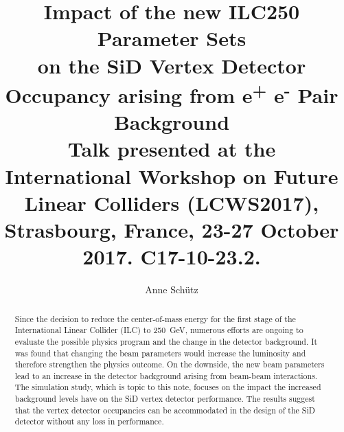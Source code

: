\documentclass[12pt]{article}
\newcommand{\sid}{SiD\xspace}
\newcommand{\electron}{e\textsuperscript{-}\xspace}
\newcommand{\positron}{e\textsuperscript{+}\xspace}
\begin{document}

\title{Impact of the new ILC250 Parameter Sets\\on the \sid Vertex Detector Occupancy arising from \positron\electron Pair Background\vspace*{0.3cm}\\{\normalsize Talk presented at the\\\large International Workshop on Future Linear Colliders (LCWS2017), Strasbourg, France, 23-27 October 2017. C17-10-23.2.}}

\author[1,2]{Anne Sch\"utz}


\maketitle


\begin{abstract}
Since the decision to reduce the center-of-mass energy for the first stage of the International Linear Collider (ILC) to \SI{250}{\GeV}, numerous efforts are ongoing to evaluate the possible physics program and the change in the detector background.
It was found that changing the beam parameters would increase the luminosity and therefore strengthen the physics outcome.
On the downside, the new beam parameters lead to an increase in the detector background arising from beam-beam interactions.
\\
The simulation study, which is topic to this note, focuses on the impact the increased background levels have on the SiD vertex detector performance.
The results suggest that the vertex detector occupancies can be accommodated in the design of the SiD detector without any loss in performance.
\end{abstract}


\end{document}

